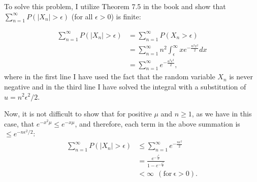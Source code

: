 \begin{problem}{19} To solve this problem, I utilize Theorem 7.5 in the book and show that $\sum_{n=1}^\infty P(|X_n| > \epsilon)$ (for all $\epsilon>0$) is finite:

\begin{align*}
\sum_{n=1}^\infty P(|X_n| > \epsilon) &=\sum_{n=1}^\infty P(X_n > \epsilon) \\
&=\sum_{n=1}^\infty n^2 \int_\epsilon^\infty x e^{-\frac{n^2 x^2}{2}} dx\\
&=\sum_{n=1}^\infty e^{-\frac{n^2 \epsilon^2}{2}},
\end{align*}
where in the first line I have used the fact that the random variable $X_n$ is never negative and in the third line I have solved the integral with a substitution of $u =n^2 \epsilon^2/2$.

Now, it is not difficult to show that for positive $\mu$ and $n\ge 1$, as we have in this case, that $e^{-x^2 \mu }\le e^{-x \mu }$, and therefore, each term in the above summation is $\le e^{-n \epsilon^2/2}$:
\begin{align*}
\sum_{n=1}^\infty P(|X_n| > \epsilon) & \le \sum_{n=1}^\infty e^{-\frac{n \epsilon^2}{2}} \\
&=\frac{e^{-\frac{\epsilon^2}{2}}}{1-e^{-\frac{\epsilon^2}{2}}} \\
& < \infty~~\mathrm{(for~\epsilon>0)}.
\end{align*}

\end{problem}

